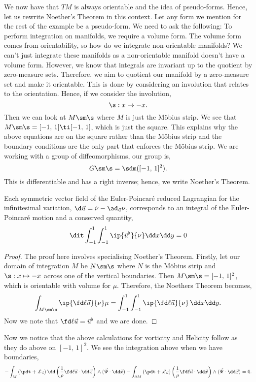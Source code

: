 \noindent
We now have that $TM$ is always orientable and the idea of pseudo-forms. Hence, let us rewrite Noether's Theorem in this context. Let any form we mention for the rest of the example be a pseudo-form. We need to ask the following: To perform integration on manifolds, we require a volume form. The volume form comes from orientability, so how do we integrate non-orientable manifolds? We can't just integrate these manifolds as a non-orientable manifold doesn't have a volume form. However, we know that integrals are invariant up to the quotient by zero-measure sets. Therefore, we aim to quotient our manifold by a zero-measure set and make it orientable. This is done by considering an involution that relates to the orientation. Hence, if we consider the involution,
$$ \s : x \mapsto -x. $$
Then we can look at $M \sm \s$ where $M$ is just the M\"obius strip. We see that $M\sm \s = [-1,\, 1] \ti [-1,\,1]$, which is just the square. This explains why the above equations are on the square rather than the M\"obius strip and the boundary conditions are the only part that enforces the M\"obius strip. We are working with a group of diffeomorphisms, our group is,
$$ G \sm \s = \sdm([-1,\,1]^2). $$
This is differentiable and has a right inverse; hence, we write Noether's Theorem.
\begin{nthm}
  Each symmetric vector field of the Euler-Poincar\'e reduced Lagrangian for the infinitesimal variation, $\d \vec u = \dot\nu - \ad_{\vec u}\nu$, corresponds to an integral of the Euler-Poincar\'e motion and a conserved quantity,
  $$ \dit \int_{-1}^1 \int_{-1}^1 \ip{\vec u^\flat}{\nu} \dd x\dd y = 0 $$
\end{nthm}
\begin{proof}
  The proof here involves specialising Noether's Theorem. Firstly, let our domain of integration $M$ be $N \sm \s$ where $N$ is the M\"obius strip and $\s : x \mapsto -x$ across one of the vertical boundaries. Then $M \sm \s = [-1,\,1]^2$, which is orientable with volume for $\mu$. Therefore, the Noethers Theorem becomes,
  $$ \int_{M\sm \s} \ip{\fd \ell {\vec u}}{\nu} \mu = \int_{-1}^1 \int_{-1}^1 \ip{\fd \ell {\vec u}}{\nu}\, \dd x \dd y. $$
  Now we note that $\fd \ell {\vec u} = \vec u^\flat$ and we are done.
\end{proof}
\noindent
Now we notice that the above calculations for vorticity and Helicity follow as they do above on $[-1,\,1]^2$. We see the integration above when we have boundaries,
$$ -\int_M \left( \pdt + \pounds_{\vec u}\right)\dd \left( \frac{1}{\rho} \fd \ell {\vec u}\cdot \dd \vec x \right) \wedge (\vec\Psi \cdot \dd \vec x) - \int_{\partial M}\left( \pdt + \pounds_{\vec u}\right) \left( \frac{1}{\rho} \fd \ell {\vec u}\cdot \dd \vec x \right) \wedge (\vec\Psi \cdot \dd \vec x) = 0. $$
